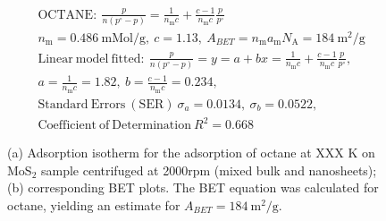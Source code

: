 

\begin{align*}
&\mathrm{OCTANE:}\ \frac{p}{n(p^\circ-p)}=\frac{1}{n_\mathrm{m}c}+\frac{c-1}{n_\mathrm{m}c}\frac{p}{p^\circ}\\
&{n_\mathrm{m}}=0.486\ \mathrm{mMol/g},\ c=1.13,\ A_{BET}={n_\mathrm{m}}{a_\mathrm{m}}{N_\mathrm{A}}=184\ \mathrm{m}^2\mathrm{/g}\\
&\mathrm{Linear\ model\ fitted:}\ \frac{p}{n(p^\circ-p)}=y=a+bx=\frac{1}{n_\mathrm{m}c}+\frac{c-1}{n_\mathrm{m}c}\frac{p}{p^\circ},\\
&a=\frac{1}{n_\mathrm{m}c}=1.82,\ b=\frac{c-1}{n_\mathrm{m}c}=0.234,\\
&\mathrm{Standard\ Errors\ (SER)}\ \sigma_a=0.0134,\ \sigma_b=0.0522,\\
&\mathrm{Coefficient\ of\ Determination}\ R^2 = 0.668
\end{align*}


\begin{figure}[htb]
\hfill
{}
\caption{(a) Adsorption isotherm for the adsorption of octane at XXX K on MoS$_2$ 
sample centrifuged at 2000rpm (mixed bulk and nanosheets);
(b) corresponding BET plots. The BET equation was calculated for octane, yielding an estimate for $A_{BET}=184\ \mathrm{m}^2\mathrm{/g}$.}

\label{fig:sa-Nanosheets-Prep-II-4000rpm-3mg-01-3mm-30C-S1-SA-10ml}
\end{figure}


